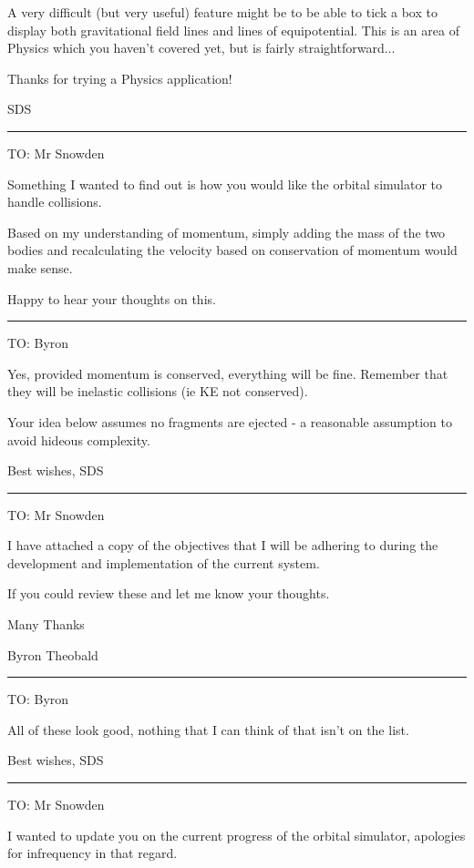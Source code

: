 {A very difficult (but very useful) feature might be to be able to tick a box to display both gravitational field lines and lines of equipotential. This is an area of Physics which you haven’t covered yet, but is fairly straightforward...

Thanks for trying a Physics application!

SDS

\vspace{8pt}
\hrule

TO: Mr Snowden

Something I wanted to find out is how you would like the orbital simulator to handle collisions.

Based on my understanding of momentum, simply adding the mass of the two bodies and recalculating the velocity based on conservation of momentum would make sense.

Happy to hear your thoughts on this.

\vspace{8pt}
\hrule

TO: Byron

Yes, provided momentum is conserved, everything will be fine. Remember that they will be 
inelastic collisions (ie KE not conserved).

Your idea below assumes no fragments are ejected - a reasonable assumption to avoid hideous complexity.

Best wishes,
SDS

\vspace{8pt}
\hrule

TO: Mr Snowden

I have attached a copy of the objectives that I will be adhering to during the development and implementation of the current system.

If you could review these and let me know your thoughts.

Many Thanks

Byron Theobald

\vspace{8pt}
\hrule

TO: Byron

All of these look good, nothing that I can think of that isn't on the list.

Best wishes,
SDS

\vspace{8pt}
\hrule

TO: Mr Snowden

I wanted to update you on the current progress of the orbital simulator, apologies for infrequency in that regard.

}
